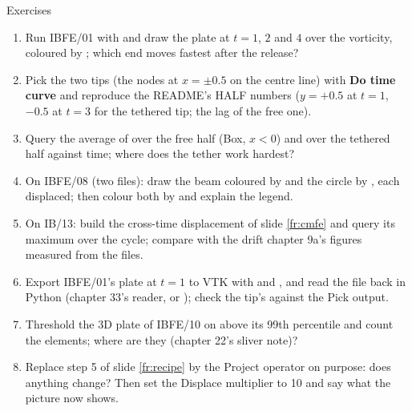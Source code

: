 \documentclass[aspectratio=169,11pt]{beamer}
\newcommand{\gui}[1]{\textsf{\textbf{#1}}}
\begin{document}
\begin{frame}{Exercises}
\label{fr:exercises}
\footnotesize
\begin{enumerate}
  \item Run IBFE/01 with  and draw the plate at $t = 1$, $2$ and $4$ over the vorticity, coloured by ; which end moves fastest after the release?
  \item Pick the two tips (the nodes at $x = \pm 0.5$ on the centre line) with \gui{Do time curve} and reproduce the README's HALF numbers ($y = +0.5$ at $t = 1$, $-0.5$ at $t = 3$ for the tethered tip; the lag of the free one).
  \item Query the average of  over the free half (Box, $x < 0$) and over the tethered half against time; where does the tether work hardest?
  \item On IBFE/08 (two files): draw the beam coloured by  and the circle by , each displaced; then colour both by  and explain the legend.
  \item On IB/13: build the cross-time displacement of slide \ref{fr:cmfe} and query its maximum over the cycle; compare with the drift chapter 9a's figures measured from the  files.
  \item Export IBFE/01's plate at $t = 1$ to VTK with  and , and read the file back in Python (chapter 33's reader, or ); check the tip's  against the Pick output.
  \item Threshold the 3D plate of IBFE/10 on  above its 99th percentile and count the elements; where are they (chapter 22's sliver note)?
  \item Replace step 5 of slide \ref{fr:recipe} by the Project operator on purpose: does anything change? Then set the Displace multiplier to 10 and say what the picture now shows.
\end{enumerate}
\end{frame}
\end{document}
